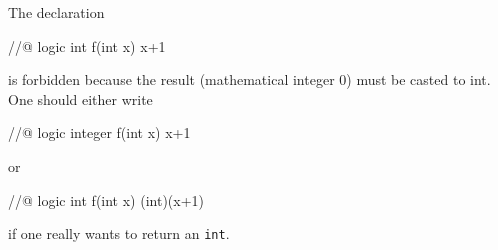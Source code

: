 \begin{example}
  The declaration
  \begin{c}
    //@ logic int f(int x) { x+1 }
  \end{c}
  is forbidden because the result (mathematical integer 0) must be
  casted to int.  One should either write
  \begin{c}
    //@ logic integer f(int x) { x+1 }
  \end{c}
  or
  \begin{c}
    //@ logic int f(int x) { (int)(x+1) }
  \end{c}
if one really wants to return an \verb|int|.
\end{example}